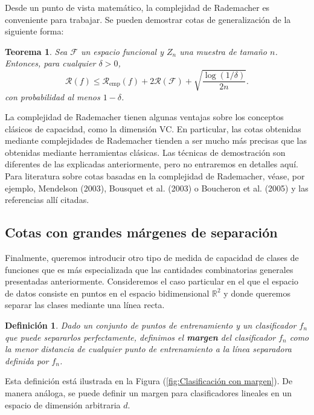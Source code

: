\documentclass{report}
\newtheorem{thm}{Teorema}[subsection]
\newtheorem{dfn}{Definición}[subsection]
\begin{document}
Desde un punto de vista matemático, la complejidad de Rademacher es conveniente para trabajar. Se pueden 
demostrar cotas de generalización de la siguiente forma:
\begin{thm}
    Sea $\mathcal{F}$ un espacio funcional y $Z_n$ una muestra de tamaño $n$. Entonces, para cualquier $\delta > 0$,
\[
\mathcal{R}(f) \leq \mathcal{R}_{\text{emp}}(f) + 2\mathscr{R}(\mathcal{F}) + \sqrt{\frac{\log(1/\delta)}{2n}}.
\]
con probabilidad al menos \(1 - \delta\).\\
\end{thm}

La complejidad de Rademacher tienen algunas ventajas sobre los conceptos clásicos de capacidad, como la 
dimensión VC. En particular, las cotas obtenidas mediante complejidades de Rademacher tienden a ser mucho más 
precisas que las obtenidas mediante herramientas clásicas. Las técnicas de demostración son diferentes de las 
explicadas anteriormente, pero no entraremos en detalles aquí. Para literatura sobre cotas basadas en la 
complejidad de Rademacher, véase, por ejemplo, Mendelson (2003), Bousquet et al. (2003) o Boucheron et al. 
(2005) y las referencias allí citadas.

\subsection{Cotas con grandes márgenes de separación}

Finalmente, queremos introducir otro tipo de medida de capacidad de clases de funciones que es 
más especializada que las cantidades combinatorias generales presentadas anteriormente. Consideremos 
el caso particular en el que el espacio de datos consiste en puntos en el espacio bidimensional 
\(\mathbb{R}^2\) y donde queremos separar las clases mediante una línea recta. 

\begin{dfn}
    Dado un conjunto de puntos de entrenamiento y un clasificador \(f_n\) que puede separarlos perfectamente, definimos 
    el \textbf{margen} del clasificador \(f_n\) como la menor distancia de cualquier punto de entrenamiento 
    a la línea separadora definida por \(f_n\).  \label{def:margen} 
\end{dfn}

Esta definición está ilustrada en la Figura (\ref{fig:Clasificación con margen}). 
De manera análoga, se puede definir un margen para clasificadores lineales en un espacio de dimensión arbitraria \(d\).
\end{document}
